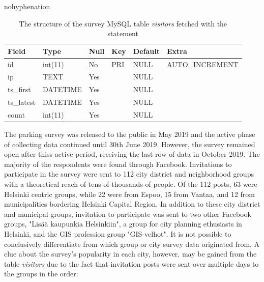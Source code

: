 \begin{hyphenrules}{nohyphenation}
    \begin{table}[H]
        \centering
        \setlength\tabcolsep{1.2ex}
        \caption[Structure of MySQL table visitors]{The structure of the survey MySQL table \textit{visitors} fetched with the statement } 
        \label{tab:mysql_visitors_str}
        \begin{tabular}{ @{} >{\raggedright\arraybackslash}p{2cm} >{\raggedright\arraybackslash}p{2cm} >{\raggedright\arraybackslash}p{1cm} >{\raggedright\arraybackslash}p{1cm} >{\raggedright\arraybackslash}p{1.5cm} >{\raggedleft\arraybackslash}p{4cm} @{} }
            \toprule
            Field & Type & Null & Key & Default & Extra \\
            \midrule
            id & int(11) & No & PRI & NULL & AUTO\_INCREMENT \\
            ip & TEXT & Yes & & NULL & \\
            ts\_first & DATETIME & Yes & & NULL & \\
            ts\_latest & DATETIME & Yes & & NULL & \\
            count & int(11) & Yes & & NULL & \\        
            \bottomrule
        \end{tabular}
    \end{table} 
\end{hyphenrules}

The parking survey was released to the public in May 2019 and the active phase of collecting data continued until 30th June 2019. However, the survey remained open after thiss active period, receiving the last row of data in October 2019. The majority of the respondents were found through Facebook. Invitations to participate in the survey were sent to 112 city district and neighborhood groups with a theoretical reach of tens of thousands of people. Of the 112 posts, 63 were Helsinki centric groups, while 22 were from Espoo, 15 from Vantaa, and 12 from municipalities bordering Helsinki Capital Region. In addition to these city district and municipal groups, invitation to participate was sent to two other Facebook groups, "Lisää kaupunkia Helsinkiin", a group for city planning ethusiasts in Helsinki, and the GIS profession group "GIS-velhot". It is not possible to conclusively differentiate from which group or city survey data originated from. A clue about the survey's popularity in each city, however, may be gained from the table \textit{visitors} due to the fact that invitation posts were sent over multiple days to the groups in the order: 

